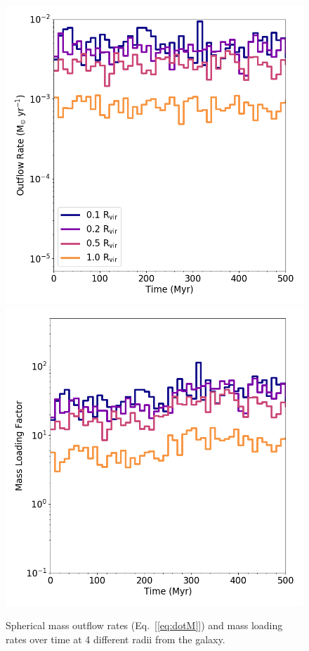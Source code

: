 \documentclass[fleqn,usenatbib,useAMS]{mnras}
\begin{document}
\begin{figure}
\includegraphics[width=0.45\linewidth]{total_mass_outflow}
\includegraphics[width=0.45\linewidth]{total_mass_loading}
\caption{Spherical mass outflow rates (Eq.~[\ref{eq:dotM}]) and mass loading rates over time at 4 different radii from the galaxy.}
\label{fig:mass_outflow}
\end{figure}
\end{document}
